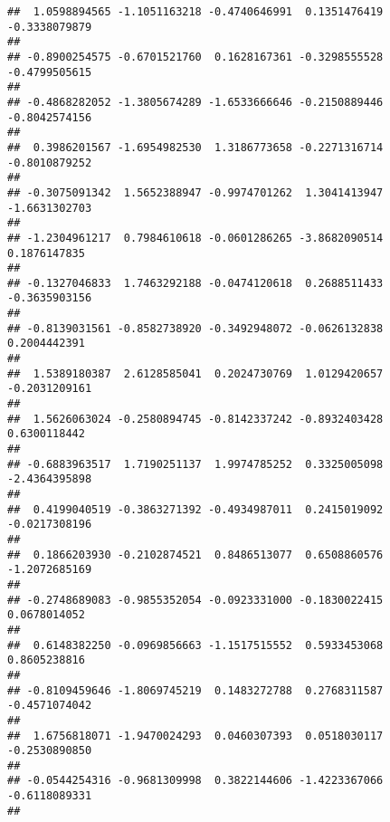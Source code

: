 \documentclass[]{article}
\begin{document}
\begin{verbatim}
##  1.0598894565 -1.1051163218 -0.4740646991  0.1351476419 -0.3338079879 
##                                                                       
## -0.8900254575 -0.6701521760  0.1628167361 -0.3298555528 -0.4799505615 
##                                                                       
## -0.4868282052 -1.3805674289 -1.6533666646 -0.2150889446 -0.8042574156 
##                                                                       
##  0.3986201567 -1.6954982530  1.3186773658 -0.2271316714 -0.8010879252 
##                                                                       
## -0.3075091342  1.5652388947 -0.9974701262  1.3041413947 -1.6631302703 
##                                                                       
## -1.2304961217  0.7984610618 -0.0601286265 -3.8682090514  0.1876147835 
##                                                                       
## -0.1327046833  1.7463292188 -0.0474120618  0.2688511433 -0.3635903156 
##                                                                       
## -0.8139031561 -0.8582738920 -0.3492948072 -0.0626132838  0.2004442391 
##                                                                       
##  1.5389180387  2.6128585041  0.2024730769  1.0129420657 -0.2031209161 
##                                                                       
##  1.5626063024 -0.2580894745 -0.8142337242 -0.8932403428  0.6300118442 
##                                                                       
## -0.6883963517  1.7190251137  1.9974785252  0.3325005098 -2.4364395898 
##                                                                       
##  0.4199040519 -0.3863271392 -0.4934987011  0.2415019092 -0.0217308196 
##                                                                       
##  0.1866203930 -0.2102874521  0.8486513077  0.6508860576 -1.2072685169 
##                                                                       
## -0.2748689083 -0.9855352054 -0.0923331000 -0.1830022415  0.0678014052 
##                                                                       
##  0.6148382250 -0.0969856663 -1.1517515552  0.5933453068  0.8605238816 
##                                                                       
## -0.8109459646 -1.8069745219  0.1483272788  0.2768311587 -0.4571074042 
##                                                                       
##  1.6756818071 -1.9470024293  0.0460307393  0.0518030117 -0.2530890850 
##                                                                       
## -0.0544254316 -0.9681309998  0.3822144606 -1.4223367066 -0.6118089331 
##                                                                       

\end{verbatim}
\end{document}
